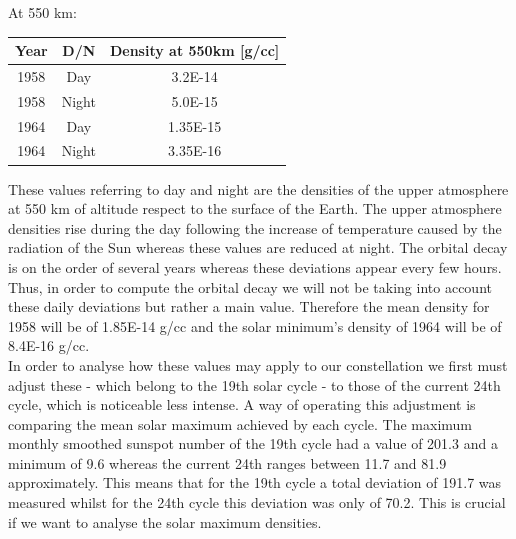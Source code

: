At 550 km:

\begin{center}
 \begin{tabular}{||c| c| c||} 
 \hline\hline
Year & D/N & Density at 550km [g/cc]\\ [1ex] 
 \hline
 1958 & Day & 3.2E-14 \\ [1ex]
 \hline
 1958 & Night & 5.0E-15\\[1ex]
 \hline
 1964 & Day & 1.35E-15 \\[1ex]
 \hline
 1964 & Night & 3.35E-16 \\[1ex]
 \hline\hline
\end{tabular}
\end{center}

These values referring to day and night are the densities of the upper atmosphere at 550 km of altitude respect to the surface of the Earth. The upper atmosphere densities rise during the day following the increase of temperature caused by the radiation of the Sun whereas these values are reduced at night. The orbital decay is on the order of several years whereas these deviations appear every few hours. Thus, in order to compute the orbital decay we will not be taking into account these daily deviations but rather a main value. Therefore the mean density for 1958 will be of 1.85E-14 g/cc and the solar minimum's density of 1964 will be of 8.4E-16 g/cc. \\

In order to analyse how these values may apply to our constellation we first must adjust these - which belong to the 19th solar cycle - to those of the current 24th cycle, which is noticeable less intense. A way of operating this adjustment is comparing the mean solar maximum achieved by each cycle. The maximum monthly smoothed sunspot number of the 19th cycle had a value of 201.3 and a minimum of 9.6 whereas the current 24th ranges between 11.7 and 81.9 approximately. This means that for the 19th cycle a total deviation of 191.7 was measured whilst for the 24th cycle this deviation was only of 70.2. This is crucial if we want to analyse the solar maximum densities.  \\

